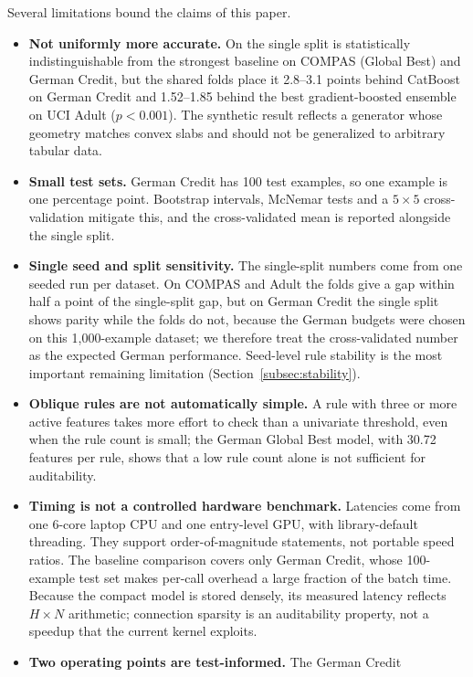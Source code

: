 Several limitations bound the claims of this paper.
\begin{itemize}
    \item \textbf{Not uniformly more accurate.} On the single split \modelname{}
    is statistically indistinguishable from the strongest baseline on COMPAS
    (Global Best) and German Credit, but the shared folds place it 2.8--3.1 points
    behind CatBoost on German Credit and 1.52--1.85 behind the best
    gradient-boosted ensemble on UCI Adult ($p < 0.001$). The synthetic result
    reflects a generator whose geometry matches convex slabs and should not be
    generalized to arbitrary tabular data.
    \item \textbf{Small test sets.} German Credit has 100 test examples, so one
    example is one percentage point. Bootstrap intervals, McNemar tests and a
    $5\times5$ cross-validation mitigate this, and the cross-validated mean is
    reported alongside the single split.
    \item \textbf{Single seed and split sensitivity.} The single-split numbers come
    from one seeded run per dataset. On COMPAS and Adult the folds give a gap
    within half a point of the single-split gap, but on German Credit the single
    split shows parity while the folds do not, because the German budgets were
    chosen on this 1{,}000-example dataset; we therefore treat the cross-validated
    number as the expected German performance. Seed-level rule stability is the
    most important remaining limitation (Section~\ref{subsec:stability}).
    \item \textbf{Oblique rules are not automatically simple.} A rule with three or
    more active features takes more effort to check than a univariate threshold,
    even when the rule count is small; the German Global Best model, with 30.72
    features per rule, shows that a low rule count alone is not sufficient for
    auditability.
    \item \textbf{Timing is not a controlled hardware benchmark.} Latencies come
    from one 6-core laptop CPU and one entry-level GPU, with library-default
    threading. They support order-of-magnitude statements, not portable speed
    ratios. The baseline comparison covers only German Credit, whose 100-example
    test set makes per-call overhead a large fraction of the batch time. Because
    the compact model is stored densely, its measured latency reflects
    $H\times N$ arithmetic; connection sparsity is an auditability property, not a
    speedup that the current kernel exploits.
    \item \textbf{Two operating points are test-informed.} The German Credit

\end{itemize}
